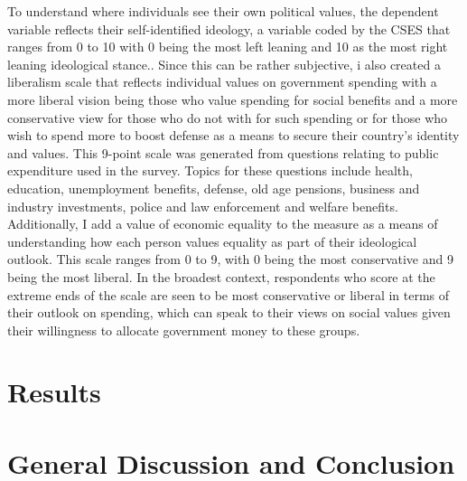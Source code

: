 \documentclass[12pt, titlepage]{article}
\begin{document}
To understand where individuals see their own political values, the dependent variable reflects their self-identified ideology, a variable coded by the CSES that ranges from 0 to 10 with 0 being the most left leaning and 10 as the most right leaning ideological stance.. Since this can be rather subjective, i also created a liberalism scale that reflects individual values on government spending with a more liberal vision being those who value spending for social benefits and a more conservative view for those who do not with for such spending or for those who wish to spend more to boost defense as a means to secure their country's identity and values. This 9-point scale was generated from questions relating to public expenditure used in the survey. Topics for these questions include health, education, unemployment benefits, defense, old age pensions, business and industry investments, police and law enforcement and welfare benefits. Additionally, I add a value of economic equality to the measure as a means of understanding how each person values equality as part of their ideological outlook. This scale ranges from 0 to 9, with 0 being the most conservative and 9 being the most liberal. In the broadest context, respondents who score at the extreme ends of the scale are seen to be most conservative or liberal in terms of their outlook on spending, which can speak to their views on social values given their willingness to allocate government money to these groups.

\section{Results}


\section{General Discussion and Conclusion}


\clearpage


\end{document}
